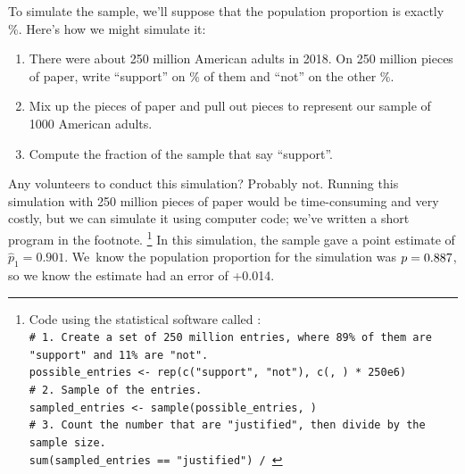 To simulate the sample, we'll suppose that the population
proportion is exactly \pewsolarpollpercent{}\%.
Here's how we might simulate it:
\begin{enumerate}
\item There were about 250 million American adults in 2018.
    On 250 million pieces of paper, write ``support''
    on \pewsolarpollpercent{}\% of them and ``not'' on
    the other \pewsolarpollpercentcomplement{}\%.
\item Mix up the pieces of paper and pull out \pewsolarpollsize{}
    pieces to represent our sample of 1000 American adults.
\item Compute the fraction of the sample that say ``support''.
\end{enumerate}
Any volunteers to conduct this simulation? Probably not. Running
this simulation with 250 million pieces of paper would be
time-consuming and very costly, but we can simulate it
using computer code; we've written a short program in the
footnote.
\footnote{Code using the statistical software called \R: \\
\texttt{\# 1. Create a set of 250 million entries,
where 89\% of them are "support" and 11\% are "not". \\
possible\_entries <- rep(c("support", "not"),
    c(\pewsolarpollprop{}, \pewsolarpollpropcomplement{}) * 250e6)\\
\# 2. Sample \pewsolarpollsize{} of the entries. \\
sampled\_entries <- sample(possible\_entries, \pewsolarpollsize{}) \\
\# 3. Count the number that are "justified", then divide
by the sample size. \\
sum(sampled\_entries == "justified") / \pewsolarpollsize{}}}
In this simulation, the sample gave a point estimate of
$\hat{p}_1 = 0.901$. We~know the population proportion
for the simulation was $p = 0.887{}$, so we know
the estimate had an error of +0.014.

